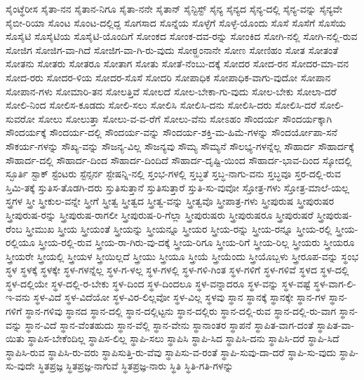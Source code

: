 {ಸೈಂಟ್ಥೆರೀಸ
ಸೈತಾ-ನನ
ಸೈತಾನ-ನಿಗೂ
ಸೈತಾ-ನನೇ
ಸೈತಾನ್
ಸೈನ್ಟಿಸ್ಟ್
ಸೈನ್ಯ
ಸೈನ್ಯದ
ಸೈನ್ಯ-ದಲ್ಲಿ
ಸೈನ್ಯ-ವನ್ನು
ಸೈನ್ಯವೇ
ಸೈಬೀ-ರಿಯಾ
ಸೊಂಟ
ಸೊಂಟ-ದಲ್ಲಿದ್ದ
ಸೊಗಸಾದ
ಸೊನ್ನೆಯ
ಸೊಳ್ಳೆಗೆ
ಸೊಳ್ಳೆ-ಯೊಂದು
ಸೊಸೆ
ಸೊಸೆಗೆ
ಸೊಸೆಯ
ಸೊಸೈಟಿ
ಸೊಸೈಟಿಯ
ಸೊಸೈಟಿ-ಯೊಂದಿಗೆ
ಸೋಂಕದ
ಸೋಂಕ-ದವ-ರನ್ನು
ಸೋಂಕಿದ
ಸೋಗಿ-ನಲ್ಲಿ
ಸೋಗಿ-ನಲ್ಲಿ-ರುವ
ಸೋಜಿಗ
ಸೋಜಿಗ-ವಾ-ಗಿದೆ
ಸೋಜಿಗ-ವಾ-ಗಿ-ರು-ವುದು
ಸೋಠ್ಹಂನಾನೇ
ಸೋಣ
ಸೋಣಿಹಂ
ಸೋತ
ಸೋತಂತೆ
ಸೋತನು
ಸೋತರು
ಸೋತರೂ
ಸೋತಾಗ
ಸೋತು
ಸೋತೆ-ನೆಂಬು-ದಕ್ಕೆ
ಸೋದರ
ಸೋದ-ರನ
ಸೋದರ-ಮಾ-ವನ
ಸೋದ-ರರು
ಸೋದರ-ಳಿಯ
ಸೋದರ-ಸೊಸೆ
ಸೋದರಿ
ಸೋಪಾಧಿಕ
ಸೋಪಾಧಿಕ-ವಾಗು-ವುದೋ
ಸೋಪಾನ
ಸೋಪಾನ-ಗಳು
ಸೋಮಾರಿ-ತನ
ಸೋಲತ್ತಿವೆ
ಸೋಲದೆ
ಸೋಲ-ಬೇಕಾ-ಗು-ವುದು
ಸೋಲ-ಬೇಕು
ಸೋಲಾ-ದರೆ
ಸೋಲಿ-ನಿಂದ
ಸೋಲಿಸ-ಕೂಡದು
ಸೋಲಿ-ಸಲು
ಸೋಲಿಸಿ
ಸೋಲಿಸಿ-ದನು
ಸೋಲಿಸಿ-ದರು
ಸೋಲಿಸಿ-ದರೆ
ಸೋಲಿ-ಸುವರೋ
ಸೋಲು
ಸೋಲುತ್ತಾ
ಸೋಲು-ವ-ವ-ರೆಗೆ
ಸೋಲು-ವೆನು
ಸೋಽಹಂ
ಸೌಂದರ್ಯ
ಸೌಂದರ್ಯಕ್ಕಾಗಿ
ಸೌಂದರ್ಯಕ್ಕೆ
ಸೌಂದರ್ಯ-ದಲ್ಲಿ
ಸೌಂದರ್ಯ-ವನ್ನು
ಸೌಂದರ್ಯ-ಶಕ್ತಿ-ಮ-ಹಿಮೆ-ಗಳನ್ನು
ಸೌಂದರ್ಯೋಪಾ-ಸನೆ
ಸೌಕರ್ಯ-ಗಳನ್ನು
ಸೌಖ್ಯ-ವನ್ನು
ಸೌಜನ್ಯ-ವಿಲ್ಲ
ಸೌಜನ್ಯವು
ಸೌಮ್ಯ
ಸೌಮ್ಯನೆ
ಸೌಲಭ್ಯ-ಗಳನ್ನೆಲ್ಲ
ಸೌಹಾರ್ದ
ಸೌಹಾರ್ದಕ್ಕೆ
ಸೌಹಾರ್ದ-ದಲ್ಲಿ
ಸೌಹಾರ್ದ-ದಿಂದ
ಸೌಹಾರ್ದ-ದಿಂದಿದೆ
ಸೌಹಾರ್ದ-ದೃಷ್ಟಿ-ಯಿಂದ
ಸೌಹಾರ್ದ-ಭಾವ-ದಿಂದ
ಸ್ಕೋದಲ್ಲಿ
ಸ್ಛೂರ್ತಿ
ಸ್ಟಾಕ್
ಸ್ಟೆಂಟರು
ಸ್ಟೆನ್ಸರ್ನ
ಸ್ಟೇಷನ್ನಿ-ನಲ್ಲಿ
ಸ್ತಂಭ-ಗಳಲ್ಲಿ
ಸ್ತಬ್ಧತೆ
ಸ್ತಬ್ಧ-ನಾಗು-ವನು
ಸ್ತಬ್ಧವೂ
ಸ್ತರ-ದಲ್ಲಿ-ರುವ
ಸ್ತಿಮಿ-ತಕ್ಕೆ
ಸ್ತುತಿಸ-ತೊಡಗಿ-ದರು
ಸ್ತುತಿಸುತ್ತಾನೆ
ಸ್ತುತಿಸುತ್ತಾರೆ
ಸ್ತುತಿ-ಸು-ವುವೋ
ಸ್ತೋತ್ರ-ಗಳು
ಸ್ತೋತ್ರ-ಮಾಲೆ-ಯಲ್ಲ
ಸ್ತ್ರಗಳ
ಸ್ತ್ರೀ
ಸ್ತ್ರೀಕುಲ-ವನ್ನೇ
ಸ್ತ್ರೀಗೆ
ಸ್ತ್ರೀತ್ವ
ಸ್ತ್ರೀತ್ವದ
ಸ್ತ್ರೀತ್ವ-ವನ್ನು
ಸ್ತ್ರೀತ್ವವೊ
ಸ್ತ್ರೀಪಾತ್ರ-ಗಳು
ಸ್ತ್ರೀಪುರುಷ
ಸ್ತ್ರೀಪುರುಷರ
ಸ್ತ್ರೀಪುರುಷ-ರನ್ನು
ಸ್ತ್ರೀಪುರುಷ-ರಾಗಲೀ
ಸ್ತ್ರೀಪುರುಷ-ರಿ-ಗೆಲ್ಲಾ
ಸ್ತ್ರೀಪುರುಷರು
ಸ್ತ್ರೀಪುರುಷರೂ
ಸ್ತ್ರೀಪುರುಷರೆ
ಸ್ತ್ರೀಪುರುಷ-ರೆಂಬ
ಸ್ತ್ರೀಮುಖ
ಸ್ತ್ರೀಯ
ಸ್ತ್ರೀಯಂತೆ
ಸ್ತ್ರೀಯನ್ನು
ಸ್ತ್ರೀಯನ್ನೂ
ಸ್ತ್ರೀಯರ
ಸ್ತ್ರೀಯ-ರನ್ನು
ಸ್ತ್ರೀಯ-ರನ್ನೂ
ಸ್ತ್ರೀಯ-ರಲ್ಲಿ
ಸ್ತ್ರೀಯ-ರಲ್ಲಿಯೂ
ಸ್ತ್ರೀಯ-ರಲ್ಲಿ-ರುವ
ಸ್ತ್ರೀಯ-ರಾ-ಗಿರು-ವು-ದಕ್ಕೆ
ಸ್ತ್ರೀಯ-ರಿಗೂ
ಸ್ತ್ರೀಯ-ರಿಗೆ
ಸ್ತ್ರೀಯ-ರಿಲ್ಲ
ಸ್ತ್ರೀಯರು
ಸ್ತ್ರೀಯರೂ
ಸ್ತ್ರೀಯರೇ
ಸ್ತ್ರೀಯಲ್ಲಿ
ಸ್ತ್ರೀಯಳ
ಸ್ತ್ರೀಯಿಲ್ಲದೆ
ಸ್ತ್ರೀಯು
ಸ್ತ್ರೀಯೂ
ಸ್ತ್ರೀಯೆ
ಸ್ತ್ರೀಯೆಂದು
ಸ್ತ್ರೀಯೊಬ್ಬಳು
ಸ್ತ್ರೀರೂಪ-ವನ್ನು
ಸ್ಥಂಭ
ಸ್ಥಳ
ಸ್ಥಳಕ್ಕೆ
ಸ್ಥಳಕ್ಕೇ
ಸ್ಥಳ-ಗಳನ್ನೆಲ್ಲ
ಸ್ಥಳ-ಗ-ಳಲ್ಲ
ಸ್ಥಳ-ಗಳಲ್ಲಿ
ಸ್ಥಳ-ಗಳಿ-ಗಿಂತ
ಸ್ಥಳ-ಗಳಿಗೆ
ಸ್ಥಳ-ಗಳಿವೆ
ಸ್ಥಳದ
ಸ್ಥಳ-ದಲ್ಲಿ
ಸ್ಥಳ-ದಲ್ಲಿಯೇ
ಸ್ಥಳ-ದಲ್ಲಿ-ರ-ಬೇಕು
ಸ್ಥಳ-ದಿಂದ
ಸ್ಥಳ-ದಿಂದಲೂ
ಸ್ಥಳ-ವನ್ನಾದರೂ
ಸ್ಥಳ-ವನ್ನು
ಸ್ಥಳ-ವಷ್ಟೆ
ಸ್ಥಳ-ವಾಗ-ಲಿ-ಇ-ವನು
ಸ್ಥಳ-ವಿದೆ
ಸ್ಥಳ-ವಿದೆಯೋ
ಸ್ಥಳ-ವಿರ-ಲಿಲ್ಲವೋ
ಸ್ಥಳ-ವಿಲ್ಲ
ಸ್ಥಳವು
ಸ್ಥಾನ
ಸ್ಥಾನಕ್ಕೆ
ಸ್ಥಾನಕ್ಕೇ
ಸ್ಥಾನ-ಗಳ
ಸ್ಥಾನ-ಗಳಿಗೆ
ಸ್ಥಾನ-ಗಳಿವು
ಸ್ಥಾನದ
ಸ್ಥಾನ-ದಲ್ಲಿ
ಸ್ಥಾನ-ದಲ್ಲಿಟ್ಟನು
ಸ್ಥಾನ-ದಲ್ಲಿರು
ಸ್ಥಾನ-ದಲ್ಲಿ-ರುವ
ಸ್ಥಾನ-ದಲ್ಲಿ-ರು-ವಾಗ
ಸ್ಥಾನ-ವನ್ನು
ಸ್ಥಾನ-ವಿದೆ
ಸ್ಥಾನ-ವೆಂತಹುದು
ಸ್ಥಾನ-ವೆಲ್ಲಿ
ಸ್ಥಾನ-ವೇನು
ಸ್ಥಾನಾಂತರ
ಸ್ಥಾಪನೆ
ಸ್ಥಾಪಿತ-ವಾಗ-ದಂತೆ
ಸ್ಥಾಪಿತ-ವಾ-ಯಿತು
ಸ್ಥಾಪಿಸ-ಬೇಕೆಂದಿಲ್ಲ
ಸ್ಥಾಪಿಸ-ಲಿಲ್ಲ
ಸ್ಥಾಪಿ-ಸಲು
ಸ್ಥಾಪಿಸಿ
ಸ್ಥಾಪಿ-ಸಿದ
ಸ್ಥಾಪಿಸಿ-ದನು
ಸ್ಥಾಪಿಸಿ-ದರೆ
ಸ್ಥಾಪಿ-ಸಿದೆ
ಸ್ಥಾಪಿಸಿ-ರುವ
ಸ್ಥಾಪಿಸಿ-ರು-ವರು
ಸ್ಥಾಪಿಸುತ್ತಿ-ರು-ವೆವು
ಸ್ಥಾಪಿಸು-ವ-ರಂತೆ
ಸ್ಥಾಪಿ-ಸುವು-ದಾ-ದರೆ
ಸ್ಥಾಪಿ-ಸು-ವುದು
ಸ್ಥಾಪಿ-ಸು-ವುದೇ
ಸ್ಥಿತಪ್ರಜ್ಞ
ಸ್ಥಿತಪ್ರಜ್ಞ-ನಾಗುವೆ
ಸ್ಥಿತಪ್ರಜ್ಞ-ನಾರು
ಸ್ಥಿತಿ
ಸ್ಥಿತಿ-ಗತಿ-ಗಳನ್ನು
}
